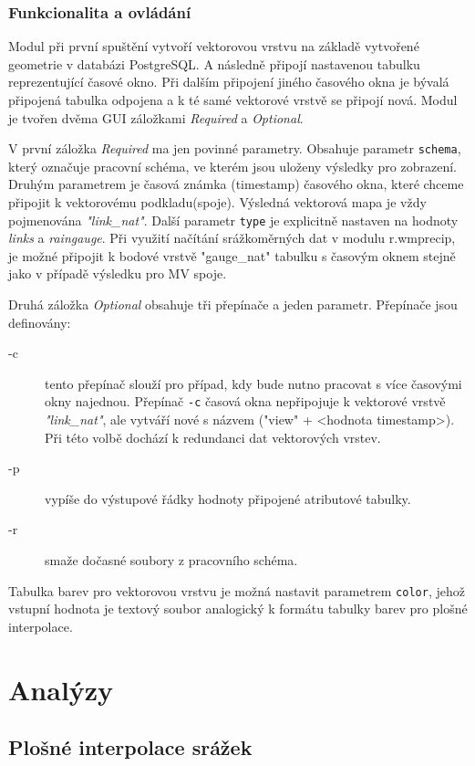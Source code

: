 \documentclass[a4paper,12pt]{report}
\begin{document}
\subsubsection{Funkcionalita a ovládání}
Modul při první spuštění vytvoří vektorovou vrstvu na základě vytvořené geometrie v databázi PostgreSQL. A následně připojí nastavenou tabulku reprezentující časové okno. Při dalším připojení jiného časového okna je bývalá připojená tabulka odpojena a k té samé vektorové vrstvě se připojí nová. Modul je tvořen dvěma GUI záložkami \textit{Required} a \textit{Optional}. 

V první záložka \textit{Required} ma jen povinné parametry. Obsahuje parametr \texttt{schema}, který označuje pracovní schéma, ve kterém jsou uloženy výsledky pro  zobrazení. Druhým parametrem je časová známka (timestamp) časového okna, které chceme připojit k vektorovému podkladu(spoje). Výsledná vektorová mapa je vždy pojmenována \textit{"link\_nat"}. Další parametr  \texttt{type} je  explicitně nastaven na hodnoty \emph{links} a \emph{raingauge}. Při využití načítání srážkoměrných dat v modulu r.wmprecip, je možné připojit k bodové vrstvě "gauge\_nat" tabulku s časovým oknem stejně jako v případě výsledku pro MV spoje.

Druhá záložka \textit{Optional} obsahuje  tři přepínače a jeden parametr.  Přepínače jsou definovány:
\begin{description}
\item[-c] tento přepínač slouží pro případ, kdy bude nutno pracovat s více časovými okny najednou. Přepínač \texttt{-c} časová okna nepřipojuje k vektorové vrstvě \textit{"link\_nat"}, ale vytváří nové s názvem ("view" + <hodnota timestamp>). Při této volbě dochází k redundanci dat vektorových vrstev.
\item[-p] vypíše do výstupové řádky hodnoty připojené atributové tabulky.
\item[-r] smaže dočasné  soubory z pracovního schéma.
\end{description}

Tabulka barev pro vektorovou vrstvu je možná nastavit parametrem \texttt{color}, jehož vstupní hodnota je textový soubor  analogický k formátu tabulky barev pro plošné interpolace.

\section{Analýzy}

\subsection{Plošné interpolace srážek}
\end{document}
